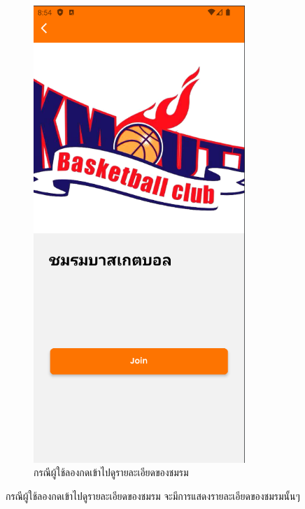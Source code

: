 \documentclass[14pt,oneside,openright,a4paper]{cpe-thai-project}
\begin{document}
\begin{figure}[!h]\centering
  \includegraphics[width=8cm]{./Pictures/Scene6.png}
  \caption{กรณีผู้ใช้ลองกดเข้าไปดูรายละเอียดของชมรม}\label{fig:DetailClubPageTest}
\end{figure}
  \hspace*{1cm} กรณีผู้ใช้ลองกดเข้าไปดูรายละเอียดของชมรม จะมีการแสดงรายละเอียดของชมรมนั้นๆ

\newpage
\end{document}
